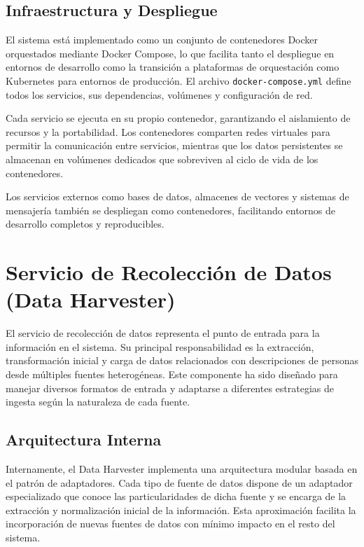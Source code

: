 \documentclass[12pt,a4paper]{article}
\begin{document}
\subsection{Infraestructura y Despliegue}
\label{subsec:infraestructura}

El sistema está implementado como un conjunto de contenedores Docker orquestados mediante Docker Compose, lo que facilita tanto el despliegue en entornos de desarrollo como la transición a plataformas de orquestación como Kubernetes para entornos de producción. El archivo \texttt{docker-compose.yml} define todos los servicios, sus dependencias, volúmenes y configuración de red.

Cada servicio se ejecuta en su propio contenedor, garantizando el aislamiento de recursos y la portabilidad. Los contenedores comparten redes virtuales para permitir la comunicación entre servicios, mientras que los datos persistentes se almacenan en volúmenes dedicados que sobreviven al ciclo de vida de los contenedores.

Los servicios externos como bases de datos, almacenes de vectores y sistemas de mensajería también se despliegan como contenedores, facilitando entornos de desarrollo completos y reproducibles.

\section{Servicio de Recolección de Datos (Data Harvester)}
\label{sec:data-harvester}

El servicio de recolección de datos representa el punto de entrada para la información en el sistema. Su principal responsabilidad es la extracción, transformación inicial y carga de datos relacionados con descripciones de personas desde múltiples fuentes heterogéneas. Este componente ha sido diseñado para manejar diversos formatos de entrada y adaptarse a diferentes estrategias de ingesta según la naturaleza de cada fuente.

\subsection{Arquitectura Interna}
\label{subsec:dh-arquitectura}

Internamente, el Data Harvester implementa una arquitectura modular basada en el patrón de adaptadores. Cada tipo de fuente de datos dispone de un adaptador especializado que conoce las particularidades de dicha fuente y se encarga de la extracción y normalización inicial de la información. Esta aproximación facilita la incorporación de nuevas fuentes de datos con mínimo impacto en el resto del sistema.
\end{document}
